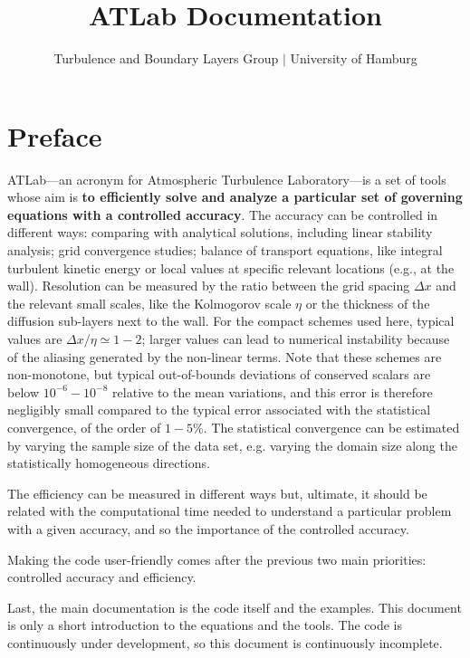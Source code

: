 \documentclass[a4paper,11pt]{book}
\title{{\bf AT}\textcolor{black!50}{Lab} Documentation}
\author{Turbulence and Boundary Layers Group $|$ University of Hamburg}
\begin{document}
\frontmatter
\pagestyle{empty}
\maketitle
\tableofcontents

\setlength{\parskip}{0.5\baselineskip}
%

\chapter*{Preface}
\sloppy

ATLab---an acronym for Atmospheric Turbulence Laboratory---is a set of tools whose aim is {\bf to efficiently solve and analyze a particular set of governing equations with a controlled accuracy}. The accuracy can be controlled in different ways: comparing with analytical solutions, including linear stability analysis; grid convergence studies; balance of transport equations, like integral turbulent kinetic energy or local values at specific relevant locations (e.g., at the wall). Resolution can be measured by the ratio between the grid spacing $\Delta x$ and the relevant small scales, like the Kolmogorov scale $\eta$ or the thickness of the diffusion sub-layers next to the wall. For the compact schemes used here, typical values are $\Delta x/\eta\simeq 1-2$; larger values can lead to numerical instability because of the aliasing generated by the non-linear terms. Note that these schemes are non-monotone, but typical out-of-bounds deviations of conserved scalars are below $10^{-6}-10^{-8}$ relative to the mean variations, and this error is therefore negligibly small compared to the typical error associated with the statistical convergence, of the order of $1-5$\%. The statistical convergence can be estimated by varying the sample size of the data set, e.g. varying the domain size along the statistically homogeneous directions. 

The efficiency can be measured in different ways but, ultimate, it should be related with the computational time needed to understand a particular problem with a given accuracy, and so the importance of the controlled accuracy. 

Making the code user-friendly comes after the previous two main priorities: controlled accuracy and efficiency.

Last, the main documentation is the code itself and the examples. This document is only a short introduction to the equations and the tools. The code is continuously under development, so this document is continuously incomplete.
\end{document}
